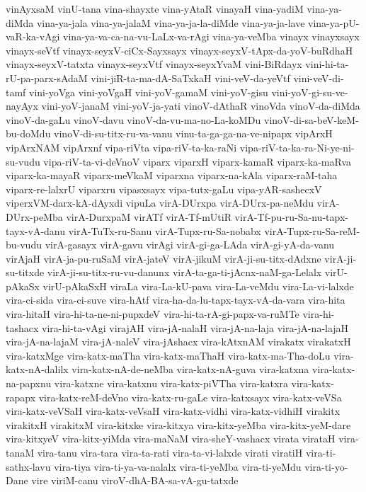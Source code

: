 {vinAyxsaM
vinU-tana
vina-shayxte
vina-yAtaR
vinayaH
vina-yadiM
vina-ya-diMda
vina-ya-jala
vina-ya-jalaM
vina-ya-ja-la-diMde
vina-ya-ja-lave
vina-ya-pU-vaR-ka-vAgi
vina-ya-va-ca-na-vu-LaLx-va-rAgi
vina-ya-veMba
vinayx
vinayxsayx
vinayx-seVtf
vinayx-seyxV-ciCx-Sayxsayx
vinayx-seyxV-tApx-da-yoV-buRdhaH
vinayx-seyxV-tatxta
vinayx-seyxVtf
vinayx-seyxYvaM
vini-BiRdayx
vini-hi-ta-rU-pa-parx-sAdaM
vini-jiR-ta-ma-dA-SaTxkaH
vini-veV-da-yeVtf
vini-veV-di-tamf
vini-yoVga
vini-yoVgaH
vini-yoV-gamaM
vini-yoV-gisu
vini-yoV-gi-su-ve-nayAyx
vini-yoV-janaM
vini-yoV-ja-yati
vinoV-dAthaR
vinoVda
vinoV-da-diMda
vinoV-da-gaLu
vinoV-davu
vinoV-da-vu-ma-no-La-koMDu
vinoV-di-sa-beV-keM-bu-doMdu
vinoV-di-su-titx-ru-va-vanu
vinu-ta-ga-ga-na-ve-nipapx
vipArxH
vipArxNAM
vipArxnf
vipa-riVta
vipa-riV-ta-ka-raNi
vipa-riV-ta-ka-ra-Ni-ye-ni-su-vudu
vipa-riV-ta-vi-deVnoV
viparx
viparxH
viparx-kamaR
viparx-ka-maRva
viparx-ka-mayaR
viparx-meVkaM
viparxna
viparx-na-kAla
viparx-raM-taha
viparx-re-lalxrU
viparxru
vipasxsayx
vipa-tutx-gaLu
vipa-yAR-sashecxV
viperxVM-darx-kA-dAyxdi
vipuLa
virA-DUrxpa
virA-DUrx-pa-neMdu
virA-DUrx-peMba
virA-DurxpaM
virATf
virA-Tf-mUtiR
virA-Tf-pu-ru-Sa-nu-tapx-tayx-vA-danu
virA-TuTx-ru-Sanu
virA-Tupx-ru-Sa-nobabx
virA-Tupx-ru-Sa-reM-bu-vudu
virA-gasayx
virA-gavu
virAgi
virA-gi-ga-LAda
virA-gi-yA-da-vanu
virAjaH
virA-ja-pu-ruSaM
virA-jateV
virA-jikuM
virA-ji-su-titx-dAdxne
virA-ji-su-titxde
virA-ji-su-titx-ru-vu-danunx
virA-ta-ga-ti-jAcnx-naM-ga-Lelalx
virU-pAkaSx
virU-pAkaSxH
viraLa
vira-La-kU-pava
vira-La-veMdu
vira-La-vi-lalxde
vira-ci-sida
vira-ci-suve
vira-hAtf
vira-ha-da-lu-tapx-tayx-vA-da-vara
vira-hita
vira-hitaH
vira-hi-ta-ne-ni-pupxdeV
vira-hi-ta-rA-gi-papx-va-ruMTe
vira-hi-tashacx
vira-hi-ta-vAgi
virajAH
vira-jA-nalaH
vira-jA-na-laja
vira-jA-na-lajaH
vira-jA-na-lajaM
vira-jA-naleV
vira-jAshacx
vira-kAtxnAM
virakatx
virakatxH
vira-katxMge
vira-katx-maTha
vira-katx-maThaH
vira-katx-ma-Tha-doLu
vira-katx-nA-dalilx
vira-katx-nA-de-neMba
vira-katx-nA-guva
vira-katxna
vira-katx-na-papxnu
vira-katxne
vira-katxnu
vira-katx-piVTha
vira-katxra
vira-katx-rapapx
vira-katx-reM-deVno
vira-katx-ru-gaLe
vira-katxsayx
vira-katx-veVSa
vira-katx-veVSaH
vira-katx-veVsaH
vira-katx-vidhi
vira-katx-vidhiH
virakitx
virakitxH
virakitxM
vira-kitxke
vira-kitxya
vira-kitx-yeMba
vira-kitx-yeM-dare
vira-kitxyeV
vira-kitx-yiMda
vira-maNaM
vira-sheY-vashacx
virata
virataH
vira-tanaM
vira-tanu
vira-tara
vira-ta-rati
vira-ta-vi-lalxde
virati
viratiH
vira-ti-sathx-lavu
vira-tiya
vira-ti-ya-va-nalalx
vira-ti-yeMba
vira-ti-yeMdu
vira-ti-yo-Dane
vire
viriM-canu
viroV-dhA-BA-sa-vA-gu-tatxde
}
